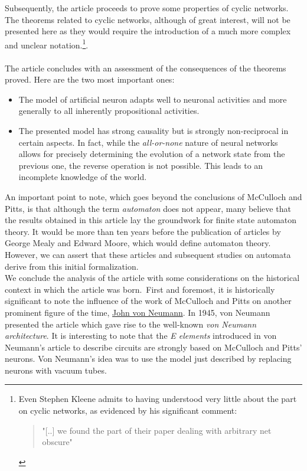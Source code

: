\documentclass[10pt]{article}
\begin{document}
Subsequently, the article proceeds to prove some properties of cyclic networks. The theorems related to cyclic networks, although of great interest, will not be presented here as they would require the introduction of a much more complex and unclear notation.\footnote{Even Stephen Kleene admits to having understood very little about the part on cyclic networks, as evidenced by his significant comment:
	\begin{quote}
		"[..] we found the part of their paper dealing with arbitrary net obscure"
\end{quote}}.\\
\\
The article concludes with an assessment of the consequences of the theorems proved. Here are the two most important ones:
\begin{itemize}
	\item The model of artificial neuron adapts well to neuronal activities and more generally to all inherently propositional activities.
	\item The presented model has strong causality but is strongly non-reciprocal in certain aspects. In fact, while the \emph{all-or-none} nature of neural networks allows for precisely determining the evolution of a network state from the previous one, the reverse operation is not possible. This leads to an incomplete knowledge of the world.
\end{itemize}
An important point to note, which goes beyond the conclusions of McCulloch and Pitts, is that although the term \emph{automaton} does not appear, many believe that the results obtained in this article lay the groundwork for finite state automaton theory. It would be more than ten years before the publication of articles by George Mealy\cite{Mealy1955} and Edward Moore\cite{Moore1956}, which would define automaton theory. However, we can assert that these articles and subsequent studies on automata derive from this initial formalization.
\\
We conclude the analysis of the article with some considerations on the historical context in which the article was born.\
First and foremost, it is historically significant to note the influence of the work of McCulloch and Pitts on another prominent figure of the time, \href{https://en.wikipedia.org/wiki/John_von_Neumann}{John von Neumann}. In 1945, von Neumann presented the article \cite{VonNeumann1945} which gave rise to the well-known \emph{von Neumann architecture}. It is interesting to note that the \emph{E elements} introduced in von Neumann's article to describe circuits are strongly based on McCulloch and Pitts' neurons. Von Neumann's idea was to use the model just described by replacing neurons with vacuum tubes.\\
\end{document}
